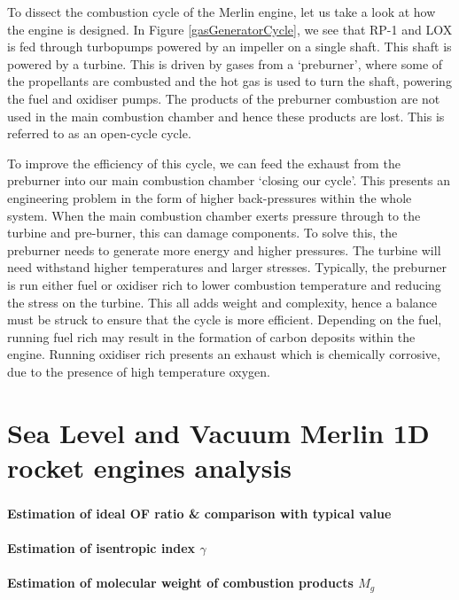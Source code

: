 \documentclass[11pt]{article}
\numberwithin{equation}{section}
\begin{document}
To dissect the combustion cycle of the Merlin engine, let us take a look at how the engine is designed. In Figure \ref{gasGeneratorCycle}, we see that RP-1 and LOX is fed through turbopumps powered by an impeller on a single shaft. This shaft is powered by a turbine. This is driven by gases from a `preburner', where some of the propellants are combusted and the hot gas is used to turn the shaft, powering the fuel and oxidiser pumps. The products of the preburner combustion are not used in the main combustion chamber and hence these products are lost. This is referred to as an open-cycle cycle. 

To improve the efficiency of this cycle, we can feed the exhaust from the preburner into our main combustion chamber `closing our cycle'. This presents an engineering problem in the form of higher back-pressures within the whole system. When the main combustion chamber exerts pressure through to the turbine and pre-burner, this can damage components. To solve this, the preburner needs to generate more energy and higher pressures. The turbine will need withstand higher temperatures and larger stresses. Typically, the preburner is run either fuel or oxidiser rich to lower combustion temperature and reducing the stress on the turbine. This all adds weight and complexity, hence a balance must be struck to ensure that the cycle is more efficient. Depending on the fuel, running fuel rich may result in the formation of carbon deposits within the engine. Running oxidiser rich presents an exhaust which is chemically corrosive, due to the presence of high temperature oxygen. 

\part{Sea Level and Vacuum Merlin 1D rocket engines analysis}
\section{}
\subsection{Estimation of ideal OF ratio \& comparison with typical value}
\subsection{Estimation of isentropic index $\gamma$}
\subsection{Estimation of molecular weight of combustion products $M_g$}
\end{document}
